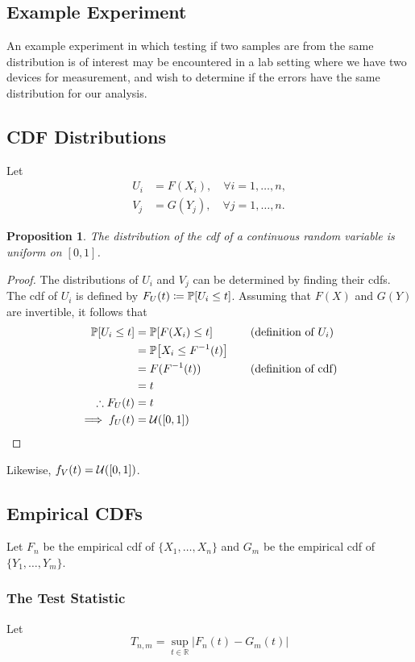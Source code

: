 \documentclass[letterpaper, reqno]{amsart}
\newtheorem{prop}{Proposition}[section]
\numberwithin{equation}{section}
\newcommand{\Prob}[1]{\mathbb{P}\mleft[#1\mright]}
\newcommand{\R}{\mathbb{R}}  %
\newcommand{\U}[2]{\mathcal{U}\mleft(\mleft[ #1, #2 \mright]\mright)}
\newcommand{\by}[1]{&\quad&\text{(#1)}}
\begin{document}
\subsection{Example Experiment}
An example experiment in which testing if two samples are from the same
distribution is of interest may be encountered in a lab setting where we have
two devices for measurement, and wish to determine if the errors have the same
distribution for our analysis.

\subsection{CDF Distributions}
Let
\begin{align*}
  U_i &= F(X_i), \quad \forall i = 1, \dots, n, \\
  V_j &= G(Y_j), \quad \forall j = 1, \dots, n.
\end{align*}

\begin{prop}
  The distribution of the cdf of a continuous random variable is uniform on $[0,
  1]$.
\end{prop}

\begin{proof}
The distributions of $U_i$ and $V_j$ can be determined by finding their cdfs.
The cdf of $U_i$ is defined by $F_U(t) \coloneqq \Prob{U_i \le t}$. Assuming that $F(X)$ and $G(Y)$ are invertible, it follows that
\begin{alignat*}{3}
  \Prob{U_i \le t} &= \Prob{F(X_i) \le t} \by{definition of $U_i$} \\
                   &= \Prob{X_i \le F^{-1}(t)} \\
                   &= F(F^{-1}(t)) \by{definition of cdf} \\
                   &= t \\
  \therefore F_U(t) &= t \\
  \implies f_U(t) &= \U{0}{1} \tag*{\qedhere}
\end{alignat*}
\end{proof}
Likewise, $f_V(t) = \U{0}{1}$.

\subsection{Empirical CDFs}
Let $F_n$ be the empirical cdf of $\{X_1, \dots, X_n\}$ and $G_m$ be the
empirical cdf of $\{Y_1, \dots, Y_m\}$.

\subsubsection{The Test Statistic}
Let
\begin{equation}
  T_{n,m} = \sup_{t \in \R} \left| F_n(t) - G_m(t) \right|
\end{equation}
\end{document}
